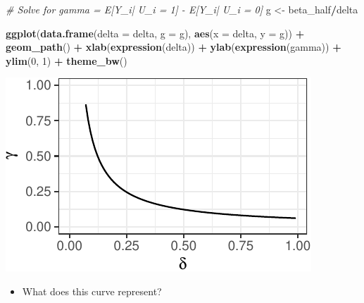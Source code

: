 \documentclass[ignorenonframetext,]{beamer}
\newenvironment{Shaded}{\begin{snugshade}}{\end{snugshade}}
\newcommand{\KeywordTok}[1]{\textcolor[rgb]{0.13,0.29,0.53}{\textbf{#1}}}
\newcommand{\DataTypeTok}[1]{\textcolor[rgb]{0.13,0.29,0.53}{#1}}
\newcommand{\DecValTok}[1]{\textcolor[rgb]{0.00,0.00,0.81}{#1}}
\newcommand{\StringTok}[1]{\textcolor[rgb]{0.31,0.60,0.02}{#1}}
\newcommand{\CommentTok}[1]{\textcolor[rgb]{0.56,0.35,0.01}{\textit{#1}}}
\newcommand{\OperatorTok}[1]{\textcolor[rgb]{0.81,0.36,0.00}{\textbf{#1}}}
\newcommand{\NormalTok}[1]{#1}
\providecommand{\tightlist}{%
  \setlength{\itemsep}{0pt}\setlength{\parskip}{0pt}}
\begin{document}
\begin{frame}[fragile]{}

\begin{Shaded}
\begin{Highlighting}[]
\CommentTok{# Solve for gamma = E[Y_i| U_i = 1] - E[Y_i| U_i = 0]}
\NormalTok{g <-}\StringTok{ }\NormalTok{beta_half}\OperatorTok{/}\NormalTok{delta}
\end{Highlighting}
\end{Shaded}

\small

\begin{Shaded}
\begin{Highlighting}[]
\KeywordTok{ggplot}\NormalTok{(}\KeywordTok{data.frame}\NormalTok{(}\DataTypeTok{delta =}\NormalTok{ delta, }\DataTypeTok{g =}\NormalTok{ g), }\KeywordTok{aes}\NormalTok{(}\DataTypeTok{x =}\NormalTok{ delta, }\DataTypeTok{y =}\NormalTok{ g)) }\OperatorTok{+}
\StringTok{  }\KeywordTok{geom_path}\NormalTok{() }\OperatorTok{+}\StringTok{ }
\StringTok{  }\KeywordTok{xlab}\NormalTok{(}\KeywordTok{expression}\NormalTok{(delta)) }\OperatorTok{+}\StringTok{ }\KeywordTok{ylab}\NormalTok{(}\KeywordTok{expression}\NormalTok{(gamma)) }\OperatorTok{+}
\StringTok{  }\KeywordTok{ylim}\NormalTok{(}\DecValTok{0}\NormalTok{, }\DecValTok{1}\NormalTok{) }\OperatorTok{+}\StringTok{ }\KeywordTok{theme_bw}\NormalTok{()}
\end{Highlighting}
\end{Shaded}

\begin{center}\includegraphics{sensitivity_analysis_files/figure-beamer/unnamed-chunk-9-1} \end{center}

\normalsize

\begin{itemize}
\tightlist
\item
  What does this curve represent?
\end{itemize}

\end{frame}
\end{document}

